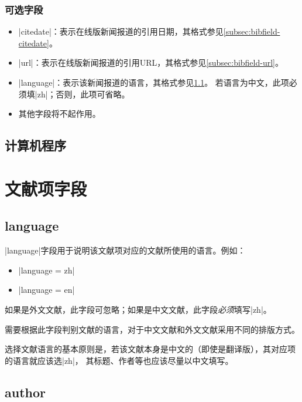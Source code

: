 \subsubsection{可选字段}

\begin{itemize}
\item |citedate|：表示在线版新闻报道的引用日期，其格式参见\ref{subsec:bibfield-citedate}。
\item |url|：表示在线版新闻报道的引用URL，其格式参见\ref{subsec:bibfield-url}。
\item |language|：表示该新闻报道的语言，其格式参见\ref{subsec:bibfield-language}。
  若语言为中文，此项必须填|zh|；否则，此项可省略。
\item 其他字段将不起作用。
\end{itemize}

\subsection{计算机程序}\label{subsec:bibtype-program}



\section{文献项字段}\label{sec:bib-field}

\subsection{language}\label{subsec:bibfield-language}

|language|字段用于说明该文献项对应的文献所使用的语言。例如：
\begin{itemize}
\item |language = {zh}|
\item |language = {en}|
\end{itemize}

如果是外文文献，此字段可忽略；如果是中文文献，此字段\emph{必须}填写|zh|。

{\BibTeX}需要根据此字段判别文献的语言，对于中文文献和外文文献采用不同的排版方式。

选择文献语言的基本原则是，若该文献本身是中文的（即使是翻译版），其对应项的语言就应该选|zh|，
其标题、作者等也应该尽量以中文填写。

\subsection{author}\label{subsec:bibfield-author}

